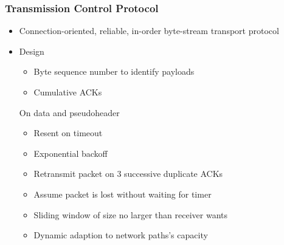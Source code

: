 \subsubsection{Transmission Control Protocol}
\begin{itemize}
    \item Connection-oriented, reliable, in-order byte-stream transport protocol
    \item Design
        \begin{itemize}
                \begin{itemize}
                    \item Byte sequence number to identify payloads
                    \item Cumulative ACKs
                \end{itemize}
             On data and pseudoheader
                \begin{itemize}
                    \item Resent on timeout
                    \item Exponential backoff
                \end{itemize}
                \begin{itemize}
                    \item Retransmit packet on $3$ successive duplicate ACKs
                    \item Assume packet is lost without waiting for timer
                \end{itemize}
                \begin{itemize}
                    \item Sliding window of size no larger than receiver wants
                \end{itemize}
                \begin{itemize}
                    \item Dynamic adaption to network paths's capacity
                \end{itemize}
        \end{itemize}
\end{itemize}

